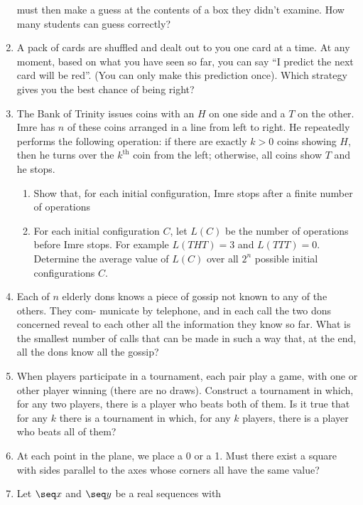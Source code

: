 \documentclass[12pt,a4paper]{article}
\begin{document}
\begin{enumerate}
       must then make a guess at the contents of a box they didn’t examine. How
       many students can guess correctly?
 \item A pack of cards are shuffled and dealt out to you one card at a time. At
       any moment, based on what you have seen so far, you can say ``I predict
       the next card will be red''. (You can only make this prediction once).
       Which strategy gives you the best chance of being right?
 \item The Bank of Trinity issues coins with an \(H\) on one side and a \(T\) on
       the other. Imre has \(n\) of these coins arranged in a line from left to
       right. He repeatedly performs the following operation: if there are
       exactly \(k > 0\) coins showing \(H\), then he turns over the
       \(k^{\text{th}}\) coin from the left; otherwise, all coins show \(T\) and
       he stops.
  \begin{enumerate}
   \item Show that, for each initial configuration, Imre stops after a finite
         number of operations
   \item For each initial configuration \(C\), let \(L(C)\) be the number of
         operations before Imre stops. For example \(L(\mathit{THT}) = 3\) and
         \(L(\mathit{TTT}) = 0\). Determine the average value of \(L(C)\) over
         all \(2^n\) possible initial configurations \(C\).
  \end{enumerate}
 \item Each of \(n\) elderly dons knows a piece of gossip not known to any of
       the others. They com- municate by telephone, and in each call the two
       dons concerned reveal to each other all the information they know so far.
       What is the smallest number of calls that can be made in such a way that,
       at the end, all the dons know all the gossip?
 \item When players participate in a tournament, each pair play a game, with one
       or other player winning (there are no draws). Construct a tournament in
       which, for any two players, there is a player who beats both of them. Is
       it true that for any \(k\) there is a tournament in which, for any \(k\)
       players, there is a player who beats all of them?
 \item At each point in the plane, we place a 0 or a 1. Must there exist a
       square with sides parallel to the axes whose corners all have the same
       value?
 \item Let \(\seq x\) and \(\seq y\) be a real sequences with

\end{enumerate}
\end{document}

